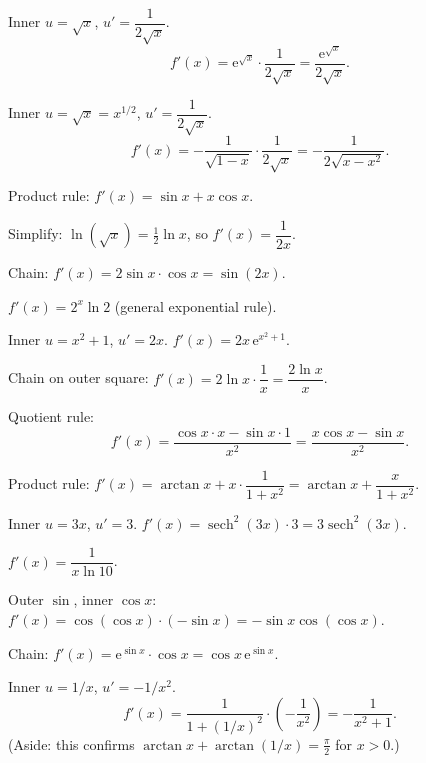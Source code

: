 \begin{solutions}
  \item Inner $u=\sqrt{x}$, $u'=\dfrac{1}{2\sqrt{x}}$.
        \[
          f'(x)=\mathrm{e}^{\sqrt{x}}\cdot\frac{1}{2\sqrt{x}}
               =\frac{\mathrm{e}^{\sqrt{x}}}{2\sqrt{x}} .
        \]

  \item Inner $u=\sqrt{x}=x^{1/2}$, $u'=\dfrac{1}{2\sqrt{x}}$.
        \[
          f'(x)=-\frac{1}{\sqrt{1-x}}\cdot\frac{1}{2\sqrt{x}}
               =-\frac{1}{2\sqrt{x-x^{2}}} .
        \]

  \item Product rule: $f'(x)=\sin x+x\cos x$.

  \item Simplify: $\ln(\sqrt{x})=\tfrac12\ln x$, so $f'(x)=\dfrac{1}{2x}$.

  \item Chain: $f'(x)=2\sin x\cdot\cos x=\sin(2x)$.

  \item $f'(x)=2^{x}\ln 2$ (general exponential rule).

  \item Inner $u=x^{2}+1$, $u'=2x$. $f'(x)=2x\,\mathrm{e}^{x^{2}+1}$.

  \item Chain on outer square: $f'(x)=2\ln x\cdot\dfrac{1}{x}
        =\dfrac{2\ln x}{x}$.

  \item Quotient rule:
        \[
          f'(x)=\frac{\cos x\cdot x-\sin x\cdot 1}{x^{2}}
               =\frac{x\cos x-\sin x}{x^{2}} .
        \]

  \item Product rule: $f'(x)=\arctan x+x\cdot\dfrac{1}{1+x^{2}}
        =\arctan x+\dfrac{x}{1+x^{2}}$.

  \item Inner $u=3x$, $u'=3$. $f'(x)=\operatorname{sech}^{2}(3x)\cdot 3
        =3\operatorname{sech}^{2}(3x)$.

  \item $f'(x)=\dfrac{1}{x\ln 10}$.

  \item Outer $\sin$, inner $\cos x$: $f'(x)=\cos(\cos x)\cdot(-\sin x)
        =-\sin x\cos(\cos x)$.

  \item Chain: $f'(x)=\mathrm{e}^{\sin x}\cdot\cos x=\cos x\,\mathrm{e}^{\sin x}$.

  \item Inner $u=1/x$, $u'=-1/x^{2}$.
        \[
          f'(x)=\frac{1}{1+(1/x)^{2}}\cdot\left(-\frac{1}{x^{2}}\right)
               =-\frac{1}{x^{2}+1} .
        \]
        (Aside: this confirms $\arctan x+\arctan(1/x)=\tfrac{\pi}{2}$ for
        $x>0$.)


\end{solutions}
